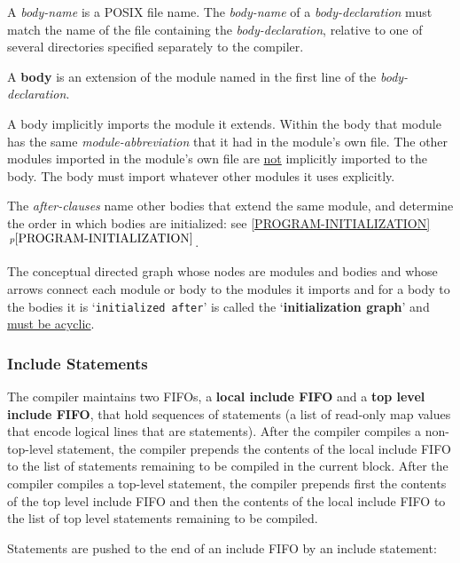\documentclass[12pt]{article}
\newcommand{\key}[1]{{\rm \bfseries #1}}
\newcommand{\itemref}[1]{\ref{#1}$\,^{p\pageref{#1}}$}
\begin{document}
A {\em body-name} is a POSIX file name.
The {\em body-name} of a {\em body-declaration} must match the
name of the file containing the
{\em body-declaration}, relative to one of several directories
specified separately to the compiler.

A \key{body} is an extension of the module named in the first
line of the {\em body-declaration}.

A body implicitly imports the module it extends.  Within the
body that module has the same {\em module-abbreviation} that it
had in the module's own file.  The other modules imported in the
module's own file are \underline{not} implicitly imported
to the body.  The body must import whatever other modules it uses
explicitly.

The {\em after-clauses} name other bodies that extend the same
module, and determine the order in which bodies are initialized:
see \itemref{PROGRAM-INITIALIZATION}.

The conceptual directed graph whose nodes are modules and bodies
and whose arrows connect each module or body to the modules it imports
and for a body to the bodies it is `{\tt initialized after}'
is called
the `\key{initialization graph}'\label{INITIALIZATION-GRAPH}
and \underline{must be acyclic}.

\subsubsection{Include Statements}
\label{INCLUDE-STATEMENTS}

The compiler maintains two FIFOs, a \key{local include FIFO} and
a \key{top level include FIFO}, that hold sequences of statements
(a list of read-only map values that encode
logical lines that are statements).
After the compiler compiles a non-top-level statement, the compiler
prepends the contents of the local include FIFO to the list of
statements remaining to be compiled in the current block.
After the compiler compiles a top-level statement, the compiler
prepends first the contents of the top level include FIFO and then
the contents of the local include FIFO to the list of top level
statements remaining to be compiled.

Statements are pushed to the end of an include FIFO by an
include statement:
\end{document}
